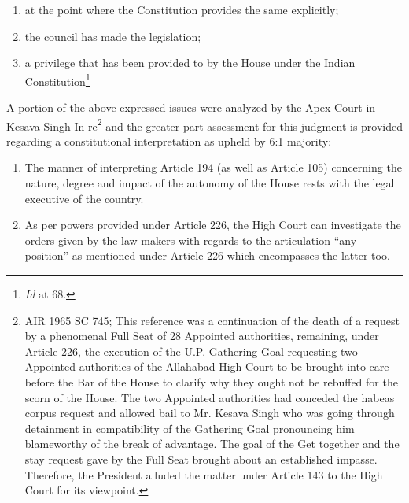 \begin{multicols}{2}
\vspace{-.25cm}

\begin{enumerate}[label=$\bullet$]
\itemsep=0pt
\item at the point where the Constitution provides the same explicitly;

\item the council has made the legislation;

\item a privilege that has been provided to by the House under the Indian Constitution\footnote{\textit{Id} at 68.}
\end{enumerate}

\vspace{-.25cm}

\noi
A portion of the above-expressed issues were analyzed by the Apex Court in Kesava Singh In
re\footnote{AIR 1965 SC 745; This reference was a continuation of the death of a request by a phenomenal Full Seat of
28 Appointed authorities, remaining, under Article 226, the execution of the U.P. Gathering Goal requesting two
Appointed authorities of the Allahabad High Court to be brought into care before the Bar of the House to clarify
why they ought not be rebuffed for the scorn of the House. The two Appointed authorities had conceded the
habeas corpus request and allowed bail to Mr. Kesava Singh who was going through detainment in compatibility
of the Gathering Goal pronouncing him blameworthy of the break of advantage. The goal of the Get together
and the stay request gave by the Full Seat brought about an established impasse. Therefore, the President alluded
the matter under Article 143 to the High Court for its viewpoint.} and the greater part assessment for this judgment is provided regarding a constitutional interpretation as upheld by 6:1 majority:

\vspace{-.2cm}

\begin{enumerate}[label=$\bullet$]
\itemsep=0pt

\item The manner of interpreting Article 194 (as well as Article 105) concerning the nature,
degree and impact of the autonomy of the House rests with the legal executive of the
country.

\item As per powers provided under Article 226, the High Court can investigate the orders
given by the law makers with regards to the articulation “any position” as mentioned
under Article 226 which encompasses the latter too.


\end{enumerate}
\end{multicols}
